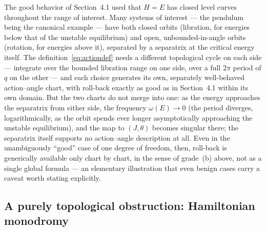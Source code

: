 \documentclass[11pt]{article}
\begin{document}
The good behavior of Section~4.1 used that $H=E$ has closed level curves throughout the range of interest. Many systems of interest --- the pendulum being the canonical example --- have both closed orbits (libration, for energies below that of the unstable equilibrium) and open, unbounded-in-angle orbits (rotation, for energies above it), separated by a separatrix at the critical energy itself. The definition~\eqref{eq:actiondef} needs a different topological cycle on each side --- integrate over the bounded libration range on one side, over a full $2\pi$ period of $q$ on the other --- and each choice generates its own, separately well-behaved action--angle chart, with roll-back exactly as good as in Section~4.1 within its own domain. But the two charts do not merge into one: as the energy approaches the separatrix from either side, the frequency $\omega(E)\to0$ (the period diverges, logarithmically, as the orbit spends ever longer asymptotically approaching the unstable equilibrium), and the map to $(J,\theta)$ becomes singular there; the separatrix itself supports no action--angle description at all. Even in the unambiguously ``good'' case of one degree of freedom, then, roll-back is generically available only chart by chart, in the sense of grade~(b) above, not as a single global formula --- an elementary illustration that even benign cases carry a caveat worth stating explicitly.

\subsection{A purely topological obstruction: Hamiltonian monodromy}
\end{document}
